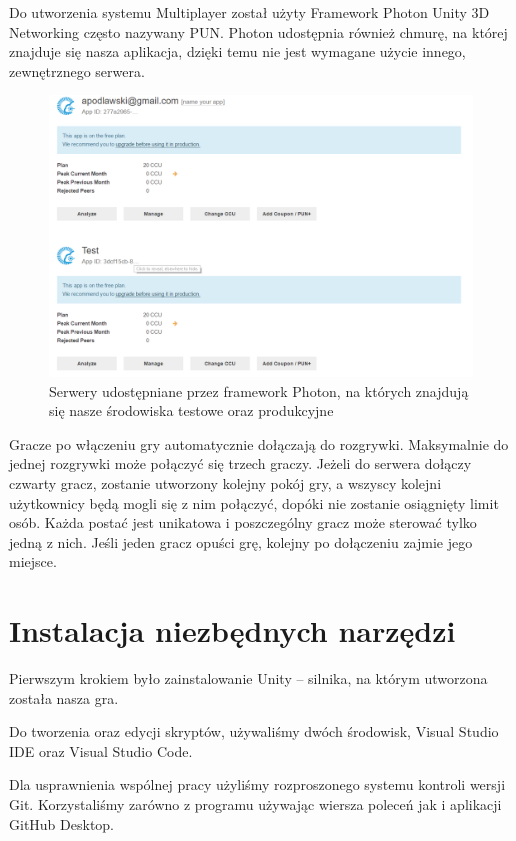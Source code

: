 \documentclass[openright]{xmgr}
\begin{document}
    Do utworzenia systemu Multiplayer został użyty Framework Photon Unity 3D Networking często nazywany PUN. 
    Photon udostępnia również chmurę, na której znajduje się nasza aplikacja, dzięki temu nie jest wymagane użycie innego, zewnętrznego serwera. 
    \begin{figure}[H]
      \center
      \includegraphics[width=\textwidth]{maszyny.png}
      \caption{Serwery udostępniane przez framework Photon, na których znajdują się nasze środowiska testowe oraz produkcyjne}
    \end{figure}
    Gracze po włączeniu gry automatycznie dołączają do rozgrywki. Maksymalnie do jednej rozgrywki może połączyć się trzech graczy. Jeżeli do serwera dołączy czwarty gracz, zostanie utworzony kolejny pokój gry, a wszyscy kolejni użytkownicy będą mogli się z nim połączyć, dopóki nie zostanie osiągnięty limit osób. 
    Każda postać jest unikatowa i poszczególny gracz może sterować tylko jedną z nich. Jeśli jeden gracz opuści grę, kolejny po dołączeniu zajmie jego miejsce. 

  \section{Instalacja niezbędnych narzędzi}

    Pierwszym krokiem było zainstalowanie Unity – silnika, na którym utworzona została nasza gra. 

    Do tworzenia oraz edycji skryptów, używaliśmy dwóch środowisk, Visual Studio IDE oraz Visual Studio Code. 

    Dla usprawnienia wspólnej pracy użyliśmy rozproszonego systemu kontroli wersji Git. Korzystaliśmy zarówno z programu używając wiersza poleceń jak i aplikacji GitHub Desktop.
\end{document}
